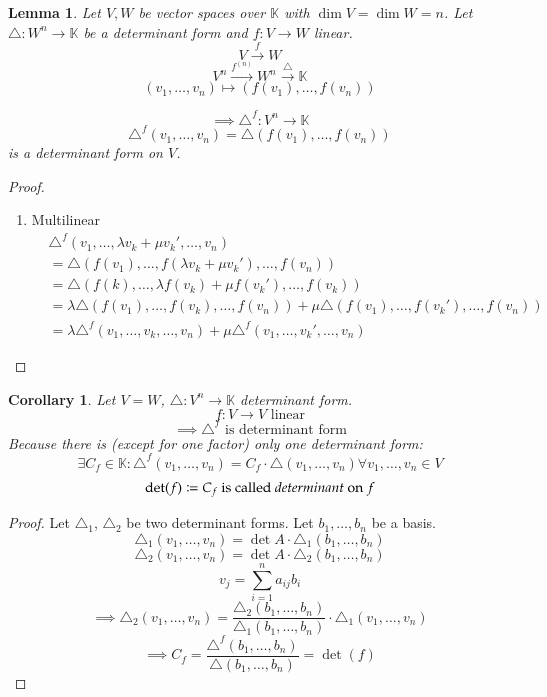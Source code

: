 \documentclass{article}
\newtheorem{lemma}{Lemma}  \numberwithin{lemma}{section}
\newtheorem{corollary}{Corollary}  \numberwithin{corollary}{section}
\begin{document}
\begin{lemma} %
  Let $V, W$ be vector spaces over $\mathbb K$ with $\dim{V} = \dim{W} = n$.
  Let $\triangle: W^n \to \mathbb K$ be a determinant form and $f: V \to W$ linear.
  \[ V \xrightarrow{f} W \]
  \[ V^n \xrightarrow{f^{(n)}} W^n \xrightarrow{\triangle} \mathbb K \]
  \[ (v_1, \dots, v_n) \mapsto (f(v_1), \dots, f(v_n)) \]

  \[ \implies \triangle^f: V^n \to \mathbb K \]
  \[ \triangle^f(v_1, \dots, v_n) = \triangle(f(v_1), \dots, f(v_n)) \]
  is a determinant form on $V$.
\end{lemma}

\begin{proof}
  \begin{enumerate}
    \item Multilinear
      \begin{align*}
        &\triangle^f (v_1, \dots, \lambda v_k + \mu v_k', \dots, v_n) \\
        &= \triangle (f(v_1), \dots, f(\lambda v_k + \mu v_k'), \dots, f(v_n)) \\
        &= \triangle(f(k), \dots, \lambda f(v_k) + \mu f(v_k'), \dots, f(v_k)) \\
        &= \lambda \triangle (f(v_1), \dots, f(v_k), \dots, f(v_n)) + \mu \triangle(f(v_1), \dots, f(v_k'), \dots, f(v_n)) \\
        &= \lambda \triangle^f(v_1, \dots, v_k, \dots, v_n) + \mu \triangle^f (v_1, \dots, v_k', \dots, v_n)
      \end{align*}
  \end{enumerate}
\end{proof}

\begin{corollary} %
  \label{cor726}
  Let $V = W$, $\triangle: V^n \to \mathbb K$ determinant form.
  \[ f: V \to V \text{ linear} \]
  \[ \implies \triangle^f \text{ is determinant form} \]
  Because there is (except for one factor) only one determinant form:
  \[ \exists C_f \in \mathbb K: \triangle^f(v_1, \dots, v_n) = C_f \cdot \triangle(v_1, \dots, v_n) \forall v_1,\dots,v_n \in V \]
  \[ \det(f) \coloneqq C_f \text{ is called \emph{determinant} on } f \]
\end{corollary}

\begin{proof}
  Let $\triangle_1$, $\triangle_2$ be two determinant forms. Let $b_1, \dots, b_n$ be a basis.
  \[ \triangle_1 (v_1, \dots, v_n) = \det{A} \cdot \triangle_1(b_1, \dots, b_n) \]
  \[ \triangle_2 (v_1, \dots, v_n) = \det{A} \cdot \triangle_2(b_1, \dots, b_n) \]
  \[ v_j = \sum_{i=1}^n a_{ij} b_i \]
  \[ \implies \triangle_2(v_1, \dots, v_n) = \frac{\triangle_2(b_1, \dots, b_n)}{\triangle_1(b_1, \dots, b_n)} \cdot \triangle_1(v_1, \dots, v_n) \]
  \[ \implies C_f = \frac{\triangle^f(b_1, \dots, b_n)}{\triangle (b_1, \dots, b_n)} = \det(f) \]
\end{proof}
\end{document}
